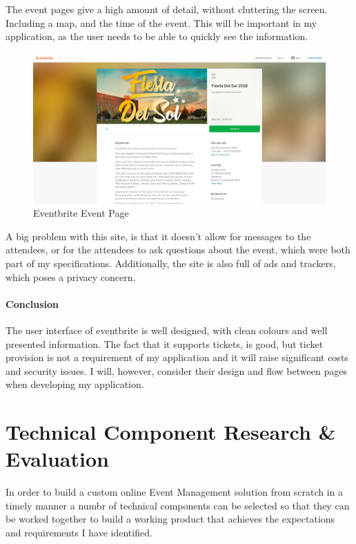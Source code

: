 \documentclass[a4paper,oneside,12pt]{report}
\begin{document}
	The event pages give a high amount of detail, without cluttering the screen. Including a map, and the time of the event. This will be important in my application, as the user needs to be able to quickly see the information.

	\begin{figure}[H]
		\caption{Eventbrite Event Page}
		\includegraphics[width=\linewidth]{static/eventbrite-event.png}
	\end{figure}

	A big problem with this site, is that it doesn't allow for messages to the attendees, or for the attendees to ask questions about the event, which were both part of my specifications. Additionally, the site is also full of ads and trackers, which poses a privacy concern.

	\subsubsection{Conclusion}
	The user interface of eventbrite is well designed, with clean colours and well presented information. The fact that it supports tickets, is good, but ticket provision is not a requirement of my application and it will raise significant costs and security issues. I will, however, consider their design and flow between pages when developing my application.

	\chapter{Technical Component Research \& Evaluation}
	In order to build a custom online Event Management solution from scratch in a timely manner a numbr of technical components can be selected so that they can be worked together to build a working product that achieves the expectations and requirements I have identified.
	
\end{document}
